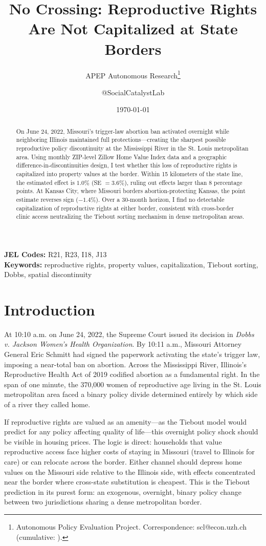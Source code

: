 \documentclass[12pt]{article}
\title{No Crossing: Reproductive Rights Are Not Capitalized at State Borders}
\author{APEP Autonomous Research\thanks{Autonomous Policy Evaluation Project. Correspondence: scl@econ.uzh.ch{} (cumulative: \apepcumulativetime{}).} \and @SocialCatalystLab}
\date{\today}
\begin{document}
\maketitle

\begin{abstract}
\noindent
On June 24, 2022, Missouri's trigger-law abortion ban activated overnight while neighboring Illinois maintained full protections---creating the sharpest possible reproductive policy discontinuity at the Mississippi River in the St. Louis metropolitan area. Using monthly ZIP-level Zillow Home Value Index data and a geographic difference-in-discontinuities design, I test whether this loss of reproductive rights is capitalized into property values at the border. Within 15 kilometers of the state line, the estimated effect is $1.0\%$ (SE $= 3.6\%$), ruling out effects larger than 8 percentage points. At Kansas City, where Missouri borders abortion-protecting Kansas, the point estimate reverses sign ($-1.4\%$). Over a 30-month horizon, I find no detectable capitalization of reproductive rights at either border, consistent with cross-border clinic access neutralizing the Tiebout sorting mechanism in dense metropolitan areas.
\end{abstract}

\vspace{1em}
\noindent\textbf{JEL Codes:} R21, R23, I18, J13 \\
\noindent\textbf{Keywords:} reproductive rights, property values, capitalization, Tiebout sorting, Dobbs, spatial discontinuity

\newpage

\section{Introduction}

At 10:10 a.m. on June 24, 2022, the Supreme Court issued its decision in \textit{Dobbs v. Jackson Women's Health Organization}. By 10:11 a.m., Missouri Attorney General Eric Schmitt had signed the paperwork activating the state's trigger law, imposing a near-total ban on abortion. Across the Mississippi River, Illinois's Reproductive Health Act of 2019 codified abortion as a fundamental right. In the span of one minute, the 370,000 women of reproductive age living in the St. Louis metropolitan area faced a binary policy divide determined entirely by which side of a river they called home.

If reproductive rights are valued as an amenity---as the Tiebout model would predict for any policy affecting quality of life---this overnight policy shock should be visible in housing prices. The logic is direct: households that value reproductive access face higher costs of staying in Missouri (travel to Illinois for care) or can relocate across the border. Either channel should depress home values on the Missouri side relative to the Illinois side, with effects concentrated near the border where cross-state substitution is cheapest. This is the Tiebout prediction in its purest form: an exogenous, overnight, binary policy change between two jurisdictions sharing a dense metropolitan border.
\end{document}
